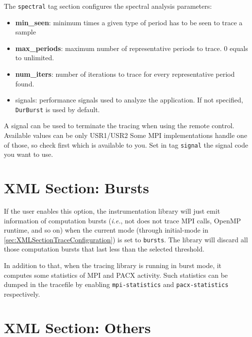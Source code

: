 The {\tt spectral} tag section configures the spectral analysis parameters:
\begin{itemize}
 \item {\bf min\_seen}: minimum times a given type of period has to be seen to trace a sample
 \item {\bf max\_periods}: maximum number of representative periods to trace. 0 equals to unlimited.
 \item {\bf num\_iters}: number of iterations to trace for every representative period found.
 \item {signals}: performance signals used to analyze the application. If not specified, {\tt DurBurst} is used by default.
\end{itemize}

A signal can be used to terminate the tracing when using the remote control. Available values can be only USR1/USR2 Some MPI implementations handle one of those, so check first which is available to you. Set in tag {\tt signal} the signal code you want to use.


\section{XML Section: Bursts}\label{sec:XMLSectionBursts}



If the user enables this option, the instrumentation library will just emit information of computation bursts ({\em i.e.}, not does not trace {MPI} calls, {OpenMP} runtime, and so on) when the current mode (through initial-mode in \ref{sec:XMLSectionTraceConfiguration}) is set to {\tt bursts}. The library will discard all those computation bursts that last less than the selected threshold.

In addition to that, when the tracing library is running in burst mode, it computes some statistics of MPI and PACX activity. Such statistics can be dumped in the tracefile by enabling {\tt mpi-statistics} and {\tt pacx-statistics} respectively.


\section{XML Section: Others}\label{sec:XMLSectionOthers}

